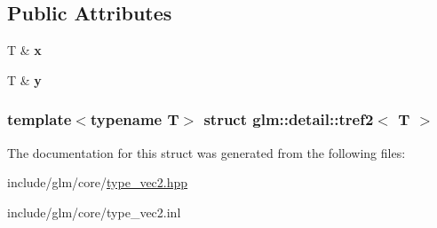 \subsection*{\-Public \-Attributes}
\begin{DoxyCompactItemize}
\item 
\hypertarget{structglm_1_1detail_1_1tref2_af28062fb8ed711515c0beb853a8a968f}{\-T \& {\bfseries x}}\label{structglm_1_1detail_1_1tref2_af28062fb8ed711515c0beb853a8a968f}

\item 
\hypertarget{structglm_1_1detail_1_1tref2_af2a3e1e998dac26176c0e26ffb9365be}{\-T \& {\bfseries y}}\label{structglm_1_1detail_1_1tref2_af2a3e1e998dac26176c0e26ffb9365be}

\end{DoxyCompactItemize}
\subsubsection*{template$<$typename \-T$>$ struct glm\-::detail\-::tref2$<$ T $>$}



\-The documentation for this struct was generated from the following files\-:\begin{DoxyCompactItemize}
\item 
include/glm/core/\hyperlink{type__vec2_8hpp}{type\-\_\-vec2.\-hpp}\item 
include/glm/core/type\-\_\-vec2.\-inl\end{DoxyCompactItemize}
